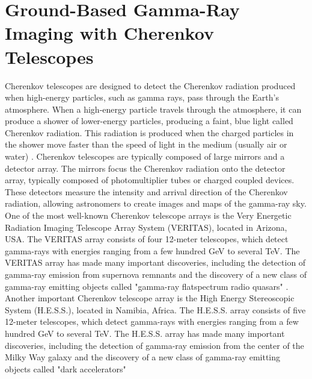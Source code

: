 \section{Ground-Based Gamma-Ray Imaging with Cherenkov Telescopes}
Cherenkov telescopes are designed to detect the Cherenkov radiation produced when high-energy particles, such as gamma rays, pass through the Earth's atmosphere. When a high-energy particle travels through the atmosphere, it can produce a shower of lower-energy particles, producing a faint, blue light called Cherenkov radiation. This radiation is produced when the charged particles in the shower move faster than the speed of light in the medium (usually air or water) \cite{ong2009gamma}. 
Cherenkov telescopes are typically composed of large mirrors and a detector array. The mirrors focus the Cherenkov radiation onto the detector array, typically composed of photomultiplier tubes or charged coupled devices. These detectors measure the intensity and arrival direction of the Cherenkov radiation, allowing astronomers to create images and maps of the gamma-ray sky.
One of the most well-known Cherenkov telescope arrays is the Very Energetic Radiation Imaging Telescope Array System (VERITAS), located in Arizona, USA. The VERITAS array consists of four 12-meter telescopes, which detect gamma-rays with energies ranging from a few hundred GeV to several TeV. The VERITAS array has made many important discoveries, including the detection of gamma-ray emission from supernova remnants and the discovery of a new class of gamma-ray emitting objects called "gamma-ray flatspectrum radio quasars" \cite{weekes2002very}.
Another important Cherenkov telescope array is the High Energy Stereoscopic System (H.E.S.S.), located in Namibia, Africa. The H.E.S.S. array consists of five 12-meter telescopes, which detect gamma-rays with energies ranging from a few hundred GeV to several TeV. The H.E.S.S. array has made many important discoveries, including the detection of gamma-ray emission from the center of the Milky Way galaxy and the discovery of a new class of gamma-ray emitting objects called "dark accelerators" \cite{aharonian2004high}

